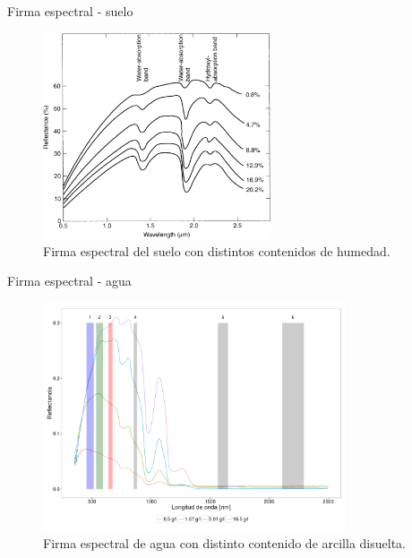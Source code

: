 \documentclass[]{beamer}
\begin{document}
\begin{frame}{Firma espectral - suelo}
    \begin{figure}
    \centering
    \includegraphics[width=0.6\textwidth]{imagenes/soilvar.png}
    \caption{Firma espectral del suelo con distintos contenidos de humedad.}
    \end{figure}
\end{frame}

\begin{frame}{Firma espectral - agua}
    \begin{figure}
    \centering
    \includegraphics[width=0.8\textwidth]{imagenes/waterm.png}
    \caption{Firma espectral de agua con distinto contenido de arcilla disuelta.}
    \end{figure}
\end{frame}
\end{document}

